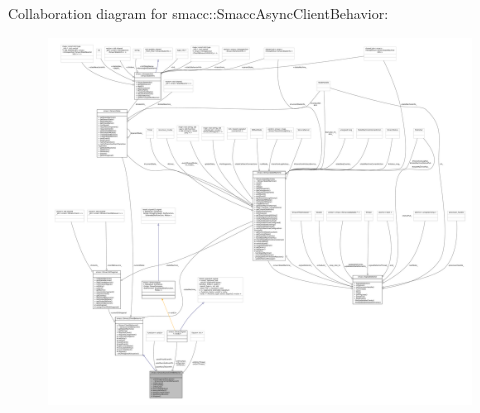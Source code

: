 Collaboration diagram for smacc\+:\+:Smacc\+Async\+Client\+Behavior\+:
\nopagebreak
\begin{figure}[H]
\begin{center}
\leavevmode
\includegraphics[width=350pt]{classsmacc_1_1SmaccAsyncClientBehavior__coll__graph}
\end{center}
\end{figure}

